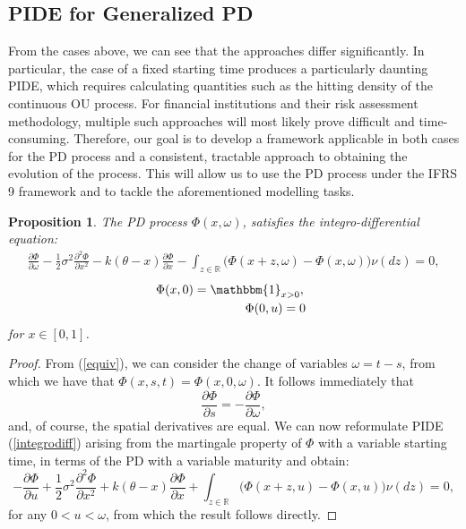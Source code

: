 \documentclass[11pt,reqno]{article}
\newtheorem{proposition}[theorem]{Proposition}
\theoremstyle{definition}
\begin{document}
\subsection{PIDE for Generalized PD}
From the cases above, we can see that the approaches differ significantly. In particular, the case of a fixed starting time produces a particularly daunting PIDE, which requires calculating quantities such as the hitting density of the continuous OU process. For financial institutions and their risk assessment methodology, multiple such approaches will most likely prove difficult and time-consuming. Therefore, our goal is to develop a framework applicable in both cases for the PD process and a consistent, tractable approach to obtaining the evolution of the process. This will allow us to use the PD process under the IFRS 9 framework and to tackle the aforementioned modelling tasks.
\begin{proposition} \label{equiv-int}
The PD process $\Phi(x,\omega)$, satisfies the integro-differential equation:
\begin{eqnarray} \label{pide2}
 \frac{\partial \Phi}{\partial \omega}-\frac{1}{2} \sigma^{2} \frac{\partial^{2} \Phi}{\partial x^{2}}-k(\theta-x) \frac{\partial \Phi}{\partial x}   -\int_{z \in \mathbb{R}}\Big(\Phi(x+z,\omega)-\Phi(x,\omega)\Big) \nu(dz)=0, 
\end{eqnarray} 
\begin{align}
\Phi(x,0)= \mathbbm{1}_{x > 0},\,\,\ \\
\Phi(0,u) = 0\,\,\,
\end{align} 
for $x \in [0,1]$. %
\end{proposition}

\begin{proof}
From (\ref{equiv}), we can consider the change of variables $\omega = t-s$, from which we have that $\Phi(x,s,t)=\Phi(x,0,\omega)$. It follows immediately that $$ \frac{\partial \Phi}{\partial s} = -\frac{\partial \Phi}{\partial \omega},$$ and, of course, the spatial derivatives are equal. We can now reformulate PIDE (\ref{integrodiff}) arising from the martingale property of $\Phi$ with a variable starting time, in terms of the PD with a variable maturity and obtain:
\begin{equation} 
- \frac{\partial \Phi}{\partial u}+\frac{1}{2} \sigma^{2} \frac{\partial^{2} \Phi}{\partial x^{2}}+k(\theta-x) \frac{\partial \Phi}{\partial x}  +\int_{z \in \mathbb{R}}\Big(\Phi(x+z,u)-\Phi(x,u)\Big) \nu(dz)=0, 
\end{equation}
for any $0<u<\omega$, from which the result follows directly.
\end{proof}
\end{document}
